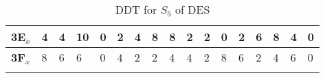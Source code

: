 \begin{longtable}[c]{|l|l|l|l|l|l|l|l|l|l|l|l|l|l|l|l|l|}
\textbf{3E$_x$} & 4              & 4              & 10             & 0              & 2              & 4              & 8              & 8              & 2              & 2              & 0              & 2              & 6              & 8              & 4              & 0              \\ \hline
\textbf{3F$_x$} & 8              & 6              & 6              & 0              & 4              & 2              & 2              & 4              & 4              & 2              & 8              & 6              & 2              & 4              & 6              & 0              \\ \hline
\caption{DDT for $S_5$ of DES}
\label{tab:ddt-s5-des}
\end{longtable}